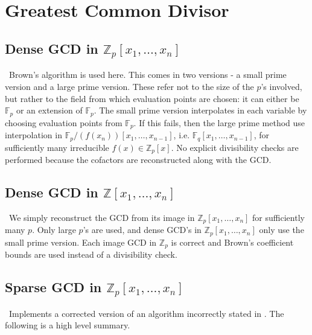 \documentclass[12pt,reqno]{amsart}
\numberwithin{equation}{section}
\newcommand{\bbZ}[0]  { \mathbb{Z}}
\newcommand{\bbF}[0]  { \mathbb{F}}
\begin{document}
\section{Greatest Common Divisor}

\subsection{Dense GCD in $\bbZ_p[x_1,\dots,x_n]$}\
Brown's algorithm \cite{Brown} is used here. This comes in two versions - a small prime version and a large prime version. These refer not to the size of the $p$'s involved, but rather to the field from which evaluation points are chosen: it can either be $\bbF_p$ or an extension of $\bbF_p$. The small prime version interpolates in each variable by choosing evaluation points from $\bbF_p$. If this fails, then the large prime method use interpolation in $\bbF_p/(f(x_n))[x_1,\dots,x_{n-1}]$, i.e. $\bbF_q[x_1,\dots,x_{n-1}]$, for sufficiently many irreducible $f(x) \in \bbZ_p[x]$. No explicit divisibility checks are performed because the cofactors are reconstructed along with the GCD.

\subsection{Dense GCD in $\bbZ[x_1,\dots,x_n]$}\
We simply reconstruct the GCD from its image in $\bbZ_p[x_1,\dots,x_n]$ for sufficiently many $p$. Only large $p$'s are used, and dense GCD's in $\bbZ_p[x_1,\dots,x_n]$ only use the small prime version. Each image GCD in $\bbZ_p$ is correct and Brown's coefficient bounds \cite{Brown} are used instead of a divisibility check.

\subsection{Sparse GCD in $\bbZ_p[x_1,\dots,x_n]$}\
Implements a corrected version of an algorithm incorrectly stated in \cite{SULING}. The following is a high level summary.
\end{document}
